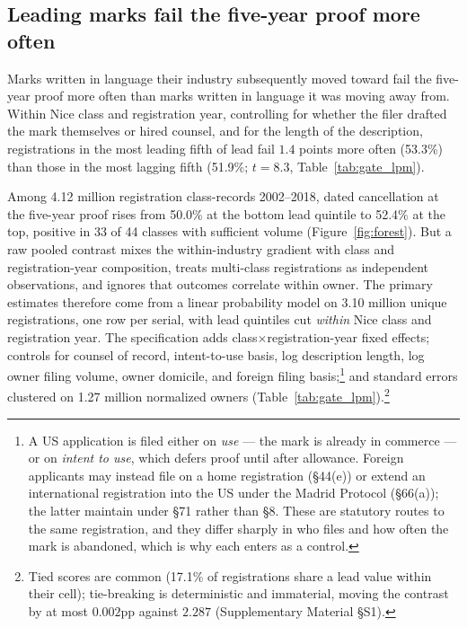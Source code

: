 \subsection{Leading marks fail the five-year proof more often}\label{sec:gate_headline}

Marks written in language their industry subsequently moved toward fail
the five-year proof more often than marks written in language it was
moving away from. Within Nice class and registration year, controlling for
whether the filer drafted the mark themselves or hired counsel, and for
the length of the description, registrations in the most leading fifth of
lead fail $1.4$ points more often (53.3\%) than those in the most lagging
fifth (51.9\%; $t = 8.3$, Table~\ref{tab:gate_lpm}).

Among 4.12 million registration class-records 2002--2018, dated
cancellation at the five-year proof rises from 50.0\% at the bottom
lead quintile to 52.4\% at the top, positive in 33 of 44 classes with
sufficient volume (Figure~\ref{fig:forest}). But a raw pooled contrast
mixes the within-industry gradient with class and registration-year
composition, treats multi-class registrations as independent observations,
and ignores that outcomes correlate within owner. The primary estimates
therefore come from a linear probability model on 3.10 million unique
registrations, one row per serial, with lead quintiles cut \emph{within}
Nice class and registration year. The specification adds
class$\times$registration-year fixed effects; controls for counsel of
record, intent-to-use basis, log description length, log owner filing
volume, owner domicile, and foreign filing basis;\footnote{A US
application is filed either on \emph{use} --- the mark is already in
commerce --- or on \emph{intent to use}, which defers proof until after
allowance. Foreign applicants may instead file on a home registration
(\S44(e)) or extend an international registration into the US under the
Madrid Protocol (\S66(a)); the latter maintain under \S71 rather than
\S8. These are statutory routes to the same registration, and they differ
sharply in who files and how often the mark is abandoned, which is why
each enters as a control.} and standard errors clustered on 1.27 million
normalized owners (Table~\ref{tab:gate_lpm}).\footnote{Tied scores are common (17.1\% of registrations share a lead
value within their cell); tie-breaking is deterministic and immaterial,
moving the contrast by at most $0.002$pp against $2.287$ (Supplementary
Material \S S1).}

